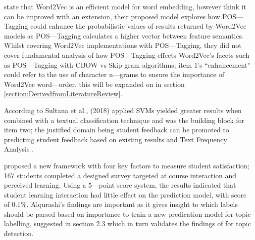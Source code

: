 \textcite{suleiman2019using} state that Word2Vec is an efficient model for word embedding, however think it can be improved with an extension, their proposed model explores how POS---Tagging could enhance the probabilistic values of results returned by Word2Vec models as POS---Tagging calculates a higher vector between feature semantics. Whilst covering Word2Vec implementations with POS---Tagging, they did not cover fundamental analysis of how POS---Tagging effects Word2Vec’s facets such as POS---Tagging with CBOW vs Skip gram algorithms; item 1’s “enhancement” could refer to the use of character n---grams to ensure the importance of Word2Vec word---order. this will be expanded on in section \ref{section:DerivedfromLiteratureReview}.

According to Sultana et al., (2018) applied SVMs yielded greater results when combined with a textual classification technique and was the building block for item two; the justified domain being student feedback can be promoted to predicting student feedback based on existing results and Text Frequency Analysis \parencite{alqurashi2019predicting}.

\textcite{alqurashi2019predicting} proposed a new framework with four key factors to measure student satisfaction; 167 students completed a designed survey targeted at course interaction and perceived learning. Using a 5---point score system, the results indicated that student learning interaction had little effect on the prediction model, with score of 0.1\%. Alqurashi’s findings are important as it gives insight to which labels should be parsed based on importance to train a new predication model for topic labelling, suggested in section 2.3 which in turn validates the findings of \parencite{unankard2019topic} for topic detection.
